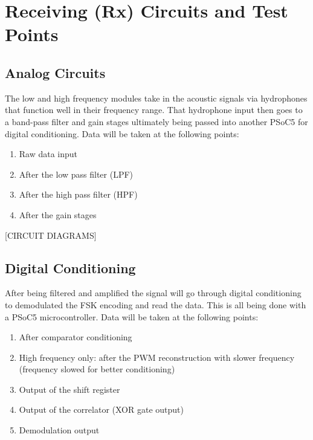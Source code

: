 \documentclass[11pt]{article} %
\begin{document}
\section{Receiving (Rx) Circuits and Test Points}
\subsection{Analog Circuits}
The low and high frequency modules take in the acoustic signals via hydrophones that function well in their frequency range. That hydrophone input then goes to a band-pass filter and gain stages ultimately being passed into another PSoC5 for digital conditioning. Data will be taken at the following points:

\begin{enumerate}
\item Raw data input
\item After the low pass filter (LPF)
\item After the high pass filter (HPF)
\item After the gain stages
\end{enumerate}
[CIRCUIT DIAGRAMS]

\subsection{Digital Conditioning}

After being filtered and amplified the signal will go through digital conditioning to demodulated the FSK encoding and read the data. This is all being done with a PSoC5 microcontroller. Data will be taken at the following points:

\begin{enumerate}
\item After comparator conditioning 
\item High frequency only: after the PWM reconstruction with slower frequency (frequency slowed for better conditioning)
\item Output of the shift register 
\item Output of the correlator (XOR gate output)
\item Demodulation output 
\end{enumerate}
\end{document}
